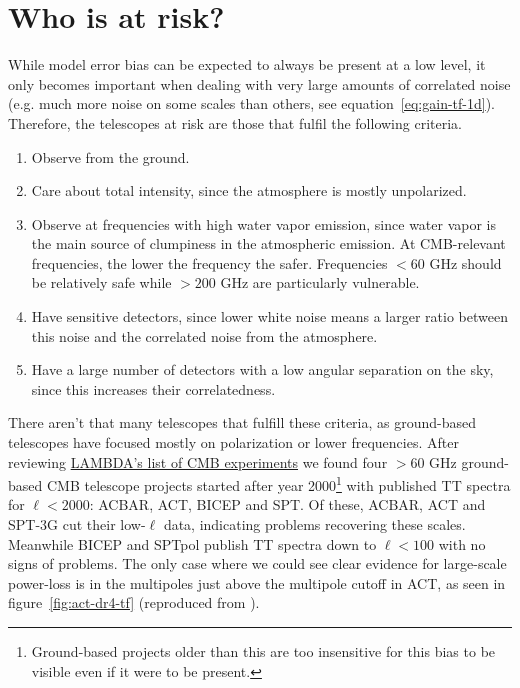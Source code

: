 \documentclass{aa}
\begin{document}
\section{Who is at risk?}
While model error bias can be expected to always be present at a
low level, it only becomes important when dealing with very large amounts
of correlated noise (e.g. much more noise on some scales than others,
see equation~\ref{eq:gain-tf-1d}). Therefore, the telescopes at risk are
those that fulfil the following criteria.
\begin{enumerate}
	\item Observe from the ground.
	\item Care about total intensity, since the atmosphere is mostly unpolarized.
	\item Observe at frequencies with high water vapor emission, since
		water vapor is the main source of clumpiness in the atmospheric emission.
		At CMB-relevant frequencies, the lower the frequency the safer.
		Frequencies $<60$ GHz should be relatively safe while $>200$ GHz are
		particularly vulnerable.
	\item Have sensitive detectors, since lower white noise means a larger
		ratio between this noise and the correlated noise from the atmosphere.
	\item Have a large number of detectors with a low angular separation on
		the sky, since this increases their correlatedness.
\end{enumerate}
There aren't that many telescopes that fulfill these criteria, as ground-based
telescopes have focused mostly on polarization or lower frequencies. After reviewing
\href{https://lambda.gsfc.nasa.gov/product/expt}{LAMBDA's list of CMB experiments}
we found four $>60$ GHz ground-based CMB telescope projects started after year 2000\footnote{
	Ground-based projects older than this are too insensitive for this bias to be visible even if
	it were to be present.}
with published TT spectra for $\ell < 2000$: ACBAR, ACT, BICEP and SPT. Of these,
ACBAR, ACT \citep{choi/etal:2020} and SPT-3G \citep{spt3g-ps-2022} cut their low-$\ell$ data, indicating problems recovering
these scales. Meanwhile BICEP \citep{barkats/etal/2013, bicep-keck-ps-2018} and SPTpol \citep{sptpol-ps-2018} publish TT spectra down to $\ell < 100$ with
no signs of problems. The only case where we could see clear evidence for large-scale
power-loss is in the multipoles just above the multipole cutoff in ACT, as seen in
figure~\ref{fig:act-dr4-tf} (reproduced from \citet{choi/etal:2020}).
\end{document}
